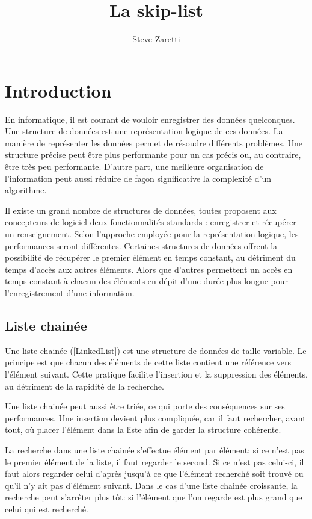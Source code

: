 \documentclass[hidelinks,a4paper, 12pt]{article}
\title{ La skip-list }
\author{Steve Zaretti}
\begin{document}
	
	\maketitle
	\newpage
	\tableofcontents
	\newpage
	
	\section{Introduction}
	En informatique, il est courant de vouloir enregistrer des données quelconques. Une structure de données est une représentation logique de ces données. La manière de représenter les données permet de résoudre différents problèmes. Une structure précise peut être plus performante pour un cas précis ou, au contraire, être très peu performante. D’autre part, une meilleure organisation de l'information peut aussi réduire de façon significative la complexité d’un algorithme.
	
	Il existe un grand nombre de structures de données, toutes proposent aux concepteurs de logiciel deux fonctionnalités standards : enregistrer et récupérer un renseignement. Selon l’approche employée pour la représentation logique, les performances seront différentes. Certaines structures de données offrent la possibilité de récupérer le premier élément en temps constant, au détriment du temps d’accès aux autres éléments. Alors que d’autres permettent un accès en temps constant à chacun des éléments en dépit d’une durée plus longue pour l’enregistrement d'une information.
	
	\subsection{Liste chainée}\label{linkList}
	Une liste chainée (\cref{LinkedList}) est une structure de données de taille variable. Le principe est que chacun des éléments de cette liste contient une référence vers l'élément suivant. Cette pratique facilite l'insertion et la suppression des éléments, au détriment de la rapidité de la recherche.
	
	Une liste chainée peut aussi être triée, ce qui porte des conséquences sur ses performances. Une insertion devient plus compliquée, car il faut rechercher, avant tout, où placer l'élément dans la liste afin de garder la structure cohérente.
	
	La recherche dans une liste chainée s'effectue élément par élément: si ce n'est pas le premier élément de la liste, il faut regarder le second. Si ce n'est pas celui-ci, il faut alors regarder celui d'après jusqu'à ce que l'élément recherché soit trouvé ou qu'il n'y ait pas d'élément suivant. Dans le cas d'une liste chainée croissante, la recherche peut s'arrêter plus tôt: si l'élément que l'on regarde est plus grand que celui qui est recherché.
	
\end{document}
